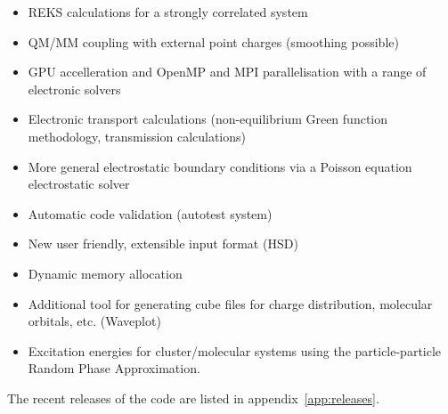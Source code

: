\begin{itemize}
\item REKS calculations for a strongly correlated system
\item QM/MM coupling with external point charges (smoothing possible)
\item GPU accelleration and OpenMP and MPI parallelisation with a
  range of electronic solvers
\item Electronic transport calculations (non-equilibrium Green function
  methodology, transmission calculations)
\item More general electrostatic boundary conditions via a Poisson equation
  electrostatic solver
\item Automatic code validation (autotest system)
\item New user friendly, extensible input format (HSD)
\item Dynamic memory allocation
\item Additional tool for generating cube files for charge distribution,
  molecular orbitals, etc. (Waveplot)
\item Excitation energies for cluster/molecular systems using the particle-particle Random Phase Approximation.
\end{itemize}

The recent releases of the code are listed in appendix~\ref{app:releases}.
